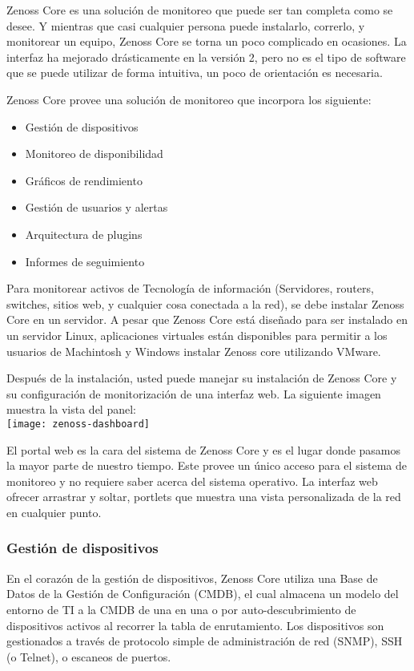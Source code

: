 Zenoss Core es una solución de monitoreo que puede ser tan
completa como se desee. Y mientras que casi cualquier
persona puede instalarlo, correrlo, y monitorear un equipo, Zenoss Core
se torna un poco complicado en ocasiones. La
interfaz ha mejorado drásticamente en la versión 2, pero no es el
tipo de software que se puede utilizar de forma intuitiva, un poco de
orientación es necesaria.

Zenoss Core provee una solución de monitoreo que incorpora los
siguiente:
\begin{itemize}
\item Gestión de dispositivos
\item Monitoreo de disponibilidad
\item Gráficos de rendimiento
\item Gestión de usuarios y alertas
\item Arquitectura de plugins
\item Informes de seguimiento
\end{itemize}

Para monitorear activos de Tecnología de información (Servidores,
routers, switches, sitios web, y cualquier cosa conectada a la red),
se debe instalar Zenoss Core en un servidor. A pesar que Zenoss Core
está diseñado para ser instalado en un servidor Linux,
aplicaciones virtuales están disponibles para permitir a los
usuarios de Machintosh y Windows instalar Zenoss core utilizando
VMware.

Después de la instalación, usted puede manejar su instalación de
Zenoss Core y su configuración de monitorización de una interfaz
web. La siguiente imagen muestra la vista del panel: \\

\texttt{[image: zenoss-dashboard]}

El portal web es la cara del sistema de Zenoss Core y es el lugar
donde pasamos la mayor parte de nuestro tiempo. Este provee un único
acceso para el sistema de monitoreo y no requiere saber acerca del
sistema operativo. La interfaz web ofrecer arrastrar y soltar,
portlets que muestra una vista personalizada de la red en cualquier
punto.

\subsubsection{Gestión de dispositivos}

En el corazón de la gestión de dispositivos, Zenoss Core utiliza
una Base de Datos de la Gestión de Configuración (CMDB), el cual
almacena un modelo del entorno de TI a la CMDB de una en una o por
auto-descubrimiento de dispositivos activos al recorrer la tabla de
enrutamiento. Los dispositivos son gestionados a través  de
protocolo simple de administración de red (SNMP), SSH (o Telnet), o
escaneos de puertos.


